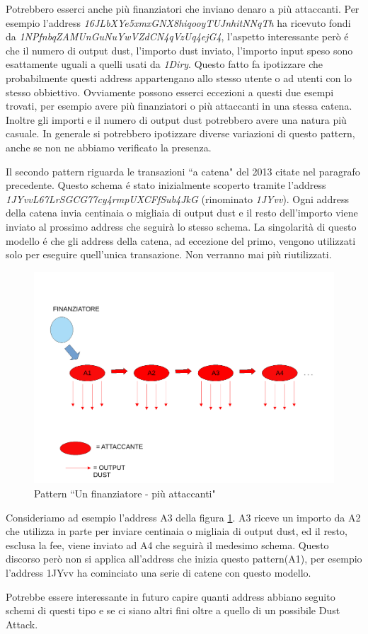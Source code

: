 Potrebbero esserci anche più finanziatori che inviano denaro a più attaccanti. Per esempio l'address \textit{16JLbXYe5xmxGNX8hiqooyTUJnhitNNqTh} ha ricevuto fondi da \textit{1NPfnbqZAMUnGuNuYwVZdCN4qVzUq4ejG4}, l'aspetto interessante però é che il numero di output dust, l'importo dust inviato, l'importo input speso sono esattamente uguali a quelli usati da \textit{1Diry}. Questo fatto fa ipotizzare che probabilmente questi address appartengano allo stesso utente o ad utenti con lo stesso obbiettivo. Ovviamente possono esserci eccezioni a questi due esempi trovati, per esempio avere più finanziatori o più attaccanti in una stessa catena. Inoltre gli importi e il numero di output dust potrebbero avere una natura più casuale. In generale si potrebbero ipotizzare diverse variazioni di questo pattern, anche se non ne abbiamo verificato la presenza.

Il secondo pattern riguarda le transazioni ``a catena" del 2013 citate nel paragrafo precedente. Questo schema é stato inizialmente scoperto tramite l'address \textit{1JYvvL67LrSGCG77cy4rmpUXCFfSub4JkG} (rinominato \textit{1JYvv}). Ogni address della catena invia centinaia o migliaia di output dust e il resto dell'importo viene inviato al prossimo address che seguirà lo stesso schema. La singolarità di questo modello é che gli address della catena, ad eccezione del primo, vengono utilizzati solo per eseguire quell'unica transazione. Non verranno mai più riutilizzati.
\begin{figure}[h!]
    \centering
    \includegraphics[scale=0.4]{Images/dust_attack2.pdf}
    \caption{Pattern ``Un finanziatore - più attaccanti"}
    \label{fig:schema2}
\end{figure}
\FloatBarrier
Consideriamo ad esempio l'address A3 della figura \ref{fig:schema2}. A3 riceve un importo da A2 che utilizza in parte per inviare centinaia o migliaia di output dust, ed il resto, esclusa la fee, viene inviato ad A4 che seguirà il medesimo schema. Questo discorso però non si applica all'address che inizia questo pattern(A1), per esempio l'address 1JYvv ha cominciato una serie di catene con questo modello.

Potrebbe essere interessante in futuro capire quanti address abbiano seguito schemi di questi tipo e se ci siano altri fini oltre a quello di un possibile Dust Attack.